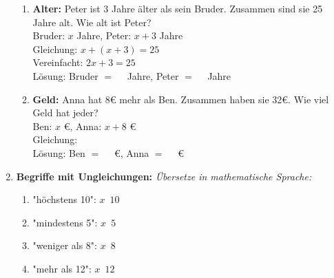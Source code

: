 \begin{enumerate}[label=\arabic*.]
\begin{enumerate}[label=\alph*)]
        \item \textbf{Alter:} Peter ist 3 Jahre älter als sein Bruder. Zusammen sind sie 25 Jahre alt. Wie alt ist Peter? \\
        Bruder: $x$ Jahre, Peter: $x + 3$ Jahre \\
        Gleichung: $x + (x + 3) = 25$ \\
        Vereinfacht: $2x + 3 = 25$ \\
        Lösung: Bruder $= \phantom{00}$ Jahre, Peter $= \phantom{00}$ Jahre
        \vspace{0.5cm}

        \item \textbf{Geld:} Anna hat 8€ mehr als Ben. Zusammen haben sie 32€. Wie viel Geld hat jeder? \\
        Ben: $x$ €, Anna: $x + 8$ € \\
        Gleichung: $\phantom{00000000000000}$ \\
        Lösung: Ben $= \phantom{00}$ €, Anna $= \phantom{00}$ €
    \end{enumerate}

    \vspace{1cm}

    \item \textbf{Begriffe mit Ungleichungen:}
    \textit{Übersetze in mathematische Sprache:}
    \vspace{0.5cm}

    \begin{enumerate}[label=\alph*)]
        \item "höchstens 10": $x \phantom{0} 10$
        \vspace{0.3cm}

        \item "mindestens 5": $x \phantom{0} 5$
        \vspace{0.3cm}

        \item "weniger als 8": $x \phantom{0} 8$
        \vspace{0.3cm}

        \item "mehr als 12": $x \phantom{0} 12$
    \end{enumerate}

\end{enumerate}